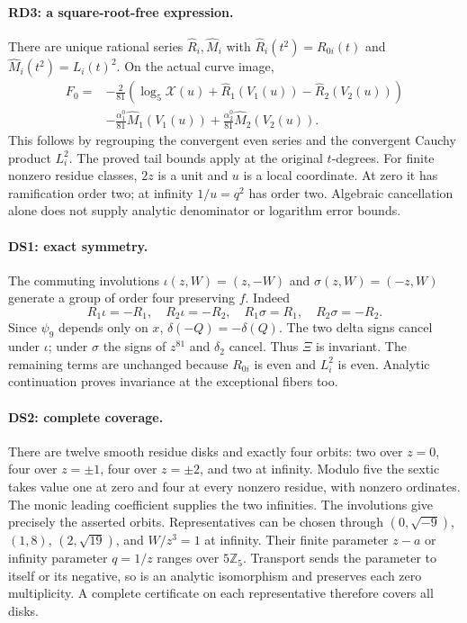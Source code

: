 \paragraph{RD3: a square-root-free expression.}
There are unique rational series $\widehat R_i,\widehat M_i$ with
$\widehat R_i(t^2)=R_{0i}(t)$ and $\widehat M_i(t^2)=L_i(t)^2$.
On the actual curve image,
\[
\begin{split}
 F_0={}&-\frac2{81}\left(\log_5\mathcal X(u)
          +\widehat R_1(V_1(u))-\widehat R_2(V_2(u))\right)\\
 &-\frac{\alpha_1^0}{81}\widehat M_1(V_1(u))
   +\frac{\alpha_2^0}{81}\widehat M_2(V_2(u)).
\end{split}
\]
This follows by regrouping the convergent even series and the convergent
Cauchy product $L_i^2$. The proved tail bounds apply at the original
$t$-degrees. For finite nonzero residue classes, $2z$ is a unit and
$u$ is a local coordinate. At zero it has ramification order two;
at infinity $1/u=q^2$ has order two. Algebraic cancellation alone does
not supply analytic denominator or logarithm error bounds.

\paragraph{DS1: exact symmetry.}
The commuting involutions $\iota(z,W)=(z,-W)$ and $\sigma(z,W)=(-z,W)$
generate a group of order four preserving $f$. Indeed
\[
 R_1\iota=-R_1,\quad R_2\iota=-R_2,\quad
 R_1\sigma=R_1,\quad R_2\sigma=-R_2.
\]
Since $\psi_9$ depends only on $x$, $\delta(-Q)=-\delta(Q)$.
The two delta signs cancel under $\iota$; under $\sigma$ the signs
of $z^{81}$ and $\delta_2$ cancel. Thus $\Xi$ is invariant.
The remaining terms are unchanged because $R_{0i}$ is even and
$L_i^2$ is even. Analytic continuation proves invariance at the
exceptional fibers too.

\paragraph{DS2: complete coverage.}
There are twelve smooth residue disks and exactly four orbits:
two over $z=0$, four over $z=\pm1$, four over $z=\pm2$, and two at
infinity. Modulo five the sextic takes value one at zero and four
at every nonzero residue, with nonzero ordinates. The monic leading
coefficient supplies the two infinities. The involutions give precisely
the asserted orbits. Representatives can be chosen through
$(0,\sqrt{-9})$, $(1,8)$, $(2,\sqrt{19})$, and $W/z^3=1$ at infinity.
Their finite parameter $z-a$ or infinity parameter $q=1/z$ ranges over
$5\mathbb Z_5$. Transport sends the parameter to itself or its negative,
so is an analytic isomorphism and preserves each zero multiplicity.
A complete certificate on each representative therefore covers all disks.

